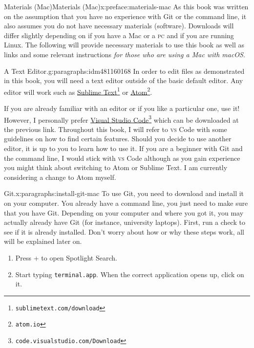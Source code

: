 \documentclass[oneside,10pt,]{book}
\newcommand{\mono}[1]{\texttt{#1}}
\newcommand{\initialism}[1]{\textsc{\MakeLowercase{#1}}}
\newcommand{\kbd}[1]{\keys{{#1}}}
\begin{document}
%
\begin{preface}{Materials (Mac)}{}{Materials (Mac)}{}{}{x:preface:materials-mac}
As this book was written on the assumption that you have no experience with Git or the command line, it also assumes you do not have necessary materials (software). Downloads will differ slightly depending on if you have a Mac or a \initialism{PC} and if you are running Linux. The following will provide necessary materials to use this book as well as links and some relevant instructions \emph{for those who are using a Mac with macOS}.%
\begin{paragraphs}{A Text Editor.}{g:paragraphs:idm481160168}%
In order to edit files as demonstrated in this book, you will need a text editor outside of the basic default editor. Any editor will work such as \href{https://www.sublimetext.com/download}{Sublime Text}\footnote{\nolinkurl{sublimetext.com/download}\label{g:fn:idm481161832}} or \href{https://atom.io}{Atom}\footnote{\nolinkurl{atom.io}\label{g:fn:idm481166056}}.%
\par
If you are already familiar with an editor or if you like a particular one, use it! However, I personally prefer \href{}{Visual Studio Code}\footnote{\nolinkurl{code.visualstudio.com/Download}\label{g:fn:idm481161704}} which can be downloaded at the previous link. Throughout this book, I will refer to \initialism{VS} Code with some guidelines on how to find certain features. Should you decide to use another editor, it is up to you to learn how to use it. If you are a beginner with Git and the command line, I would stick with \initialism{VS} Code although as you gain experience you might think about switching to Atom or Sublime Text. I am currently considering a change to Atom myself.%
\end{paragraphs}%
\begin{paragraphs}{Git.}{x:paragraphs:install-git-mac}%
To use Git, you need to download and install it on your computer. You already have a command line, you just need to make sure that you have Git. Depending on your computer and where you got it, you may actually already have Git (for instance, university laptops). First, run a check to see if it is already installed. Don't worry about how or why these steps work, all will be explained later on.%
\begin{enumerate}
\item{}Press \kbd{Command} + \kbd{Space} to open Spotlight Search.%
\item{}Start typing \mono{terminal.app}. When the correct application opens up, click on it.%

\end{enumerate}
\end{paragraphs}
\end{preface}
\end{document}
